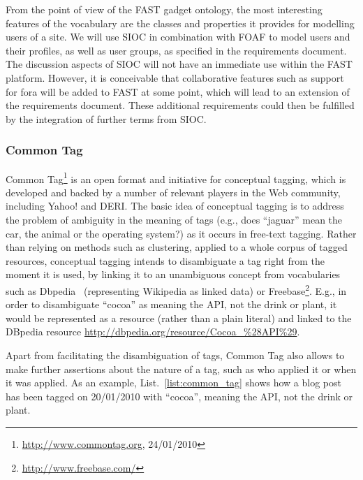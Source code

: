 \documentclass[twoside]{fast_latex}
\begin{document}
From the point of view of the FAST gadget ontology, the most interesting features of the vocabulary are the classes and properties it provides for modelling users of a site. We will use SIOC in combination with FOAF to model users and their profiles, as well as user groups, as specified in the requirements document. The discussion aspects of SIOC will not have an immediate use within the FAST platform. However, it is conceivable that collaborative features such as support for fora will be added to FAST at some point, which will lead to an extension of the requirements document. These additional requirements could then be fulfilled by the integration of further terms from SIOC.

\subsubsection{Common Tag} %
\label{ssub:common_tag}

Common Tag\footnote{\url{http://www.commontag.org}, 24/01/2010} is an open format and initiative for conceptual tagging, which is developed and backed by a number of relevant players in the Web community, including Yahoo! and DERI. The basic idea of conceptual tagging is to address the problem of ambiguity in the meaning of tags (e.g., does ``jaguar'' mean the car, the animal or the operating system?) as it occurs in free-text tagging. Rather than relying on methods such as clustering, applied to a whole corpus of tagged resources, conceptual tagging intends to disambiguate a tag right from the moment it is used, by linking it to an unambiguous concept from vocabularies such as Dbpedia~\cite{Auer07dbpedia} (representing Wikipedia as linked data) or Freebase\footnote{\url{http://www.freebase.com/}}. E.g., in order to disambiguate ``cocoa'' as meaning the API, not the drink or plant, it would be represented as a resource (rather than a plain literal) and linked to the DBpedia resource \url{http://dbpedia.org/resource/Cocoa_%28API%29}.

Apart from facilitating the disambiguation of tags, Common Tag also allows to make further assertions about the nature of a tag, such as who applied it or when it was applied. As an example, List.~\ref{list:common_tag} shows how a blog post has been tagged on 20/01/2010 with ``cocoa'', meaning the API, not the drink or plant.

\singlespacing
{}
\begin{figure}
	
\end{figure}
\doublespacing
\end{document}
